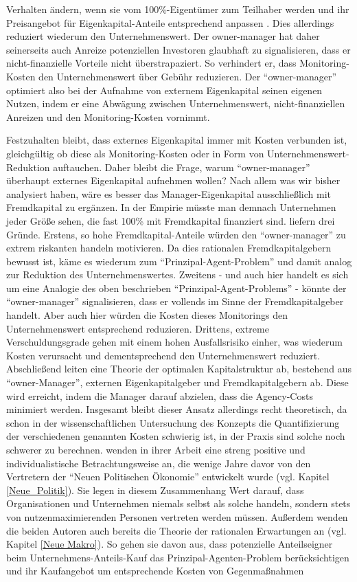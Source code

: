 Verhalten ändern, wenn sie vom 100\%-Eigentümer zum Teilhaber werden und ihr Preisangebot für Eigenkapital-Anteile entsprechend anpassen \parencite[S. 316]{Jensen1976}. Dies allerdings reduziert wiederum den Unternehmenswert. Der owner-manager hat daher seinerseits auch Anreize potenziellen Investoren glaubhaft zu signalisieren, dass er nicht-finanzielle Vorteile nicht überstrapaziert. So verhindert er, dass Monitoring-Kosten den Unternehmenswert über Gebühr reduzieren. Der "`owner-manager"' optimiert also bei der Aufnahme von externem Eigenkapital seinen eigenen Nutzen, indem er eine Abwägung zwischen Unternehmenswert, nicht-finanziellen Anreizen und den Monitoring-Kosten vornimmt.

Festzuhalten bleibt, dass externes Eigenkapital immer mit Kosten verbunden ist, gleichgültig ob diese als Monitoring-Kosten oder in Form von Unternehmenswert-Reduktion auftauchen. Daher bleibt die Frage, warum "`owner-manager"' überhaupt externes Eigenkapital aufnehmen wollen? Nach allem was wir bisher analysiert haben, wäre es besser das Manager-Eigenkapital ausschließlich mit Fremdkapital zu ergänzen. In der Empirie müsste man demnach Unternehmen jeder Größe sehen, die fast 100\% mit Fremdkapital finanziert sind. \textcite[S. 345]{Jensen1976} liefern drei Gründe. Erstens, so hohe Fremdkapital-Anteile würden den "`owner-manager"' zu extrem riskanten handeln motivieren. Da dies rationalen Fremdkapitalgebern bewusst ist, käme es wiederum zum "`Prinzipal-Agent-Problem"' und damit analog zur Reduktion des Unternehmenswertes. Zweitens - und auch hier handelt es sich um eine Analogie des oben beschrieben "`Prinzipal-Agent-Problems"' - könnte der "`owner-manager"' signalisieren, dass er vollends im Sinne der Fremdkapitalgeber handelt. Aber auch hier würden die Kosten dieses Monitorings den Unternehmenswert entsprechend reduzieren. Drittens, extreme Verschuldungsgrade gehen mit einem hohen Ausfallsrisiko einher, was wiederum Kosten verursacht und dementsprechend den Unternehmenswert reduziert. Abschließend leiten \textcite{Jensen1976} eine Theorie der optimalen Kapitalstruktur ab, bestehend aus "`owner-Manager"', externen Eigenkapitalgeber und Fremdkapitalgebern ab. Diese wird erreicht, indem die Manager darauf abzielen, dass die Agency-Costs minimiert werden. Insgesamt bleibt dieser Ansatz allerdings recht theoretisch, da schon in der wissenschaftlichen Untersuchung des Konzepts die Quantifizierung der verschiedenen genannten Kosten schwierig ist, in der Praxis sind solche noch schwerer zu berechnen. \textcite{Jensen1976} wenden in ihrer Arbeit eine streng positive und individualistische Betrachtungsweise an, die wenige Jahre davor von den Vertretern der "`Neuen Politischen Ökonomie"' entwickelt wurde (vgl. Kapitel \ref{Neue_Politik}). Sie legen in diesem Zusammenhang Wert darauf, dass Organisationen und Unternehmen niemals selbst als solche handeln, sondern stets von nutzenmaximierenden Personen vertreten werden müssen. Außerdem wenden die beiden Autoren auch bereits die Theorie der rationalen Erwartungen an (vgl. Kapitel \ref{Neue Makro}). So gehen sie davon aus, dass potenzielle Anteilseigner beim Unternehmens-Anteils-Kauf das Prinzipal-Agenten-Problem berücksichtigen und ihr Kaufangebot um entsprechende Kosten von Gegenmaßnahmen 